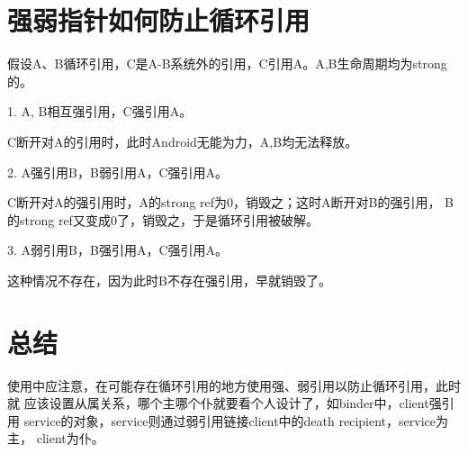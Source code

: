 \documentclass[a4paper,11pt]{article}
\begin{document}
\section[强弱指针如何防止循环引用]{强弱指针如何防止循环引用}
假设A、B循环引用，C是A-B系统外的引用，C引用A。A,B生命周期均为strong的。

1. A, B相互强引用，C强引用A。

C断开对A的引用时，此时Android无能为力，A,B均无法释放。

2. A强引用B，B弱引用A，C强引用A。

C断开对A的强引用时，A的strong ref为0，销毁之；这时A断开对B的强引用，
B的strong ref又变成0了，销毁之，于是循环引用被破解。

3. A弱引用B，B强引用A，C强引用A。

这种情况不存在，因为此时B不存在强引用，早就销毁了。

\section[总结]{总结}
使用中应注意，在可能存在循环引用的地方使用强、弱引用以防止循环引用，此时就
应该设置从属关系，哪个主哪个仆就要看个人设计了，如binder中，client强引用
service的对象，service则通过弱引用链接client中的death recipient，service为主，
client为仆。
\end{document}
